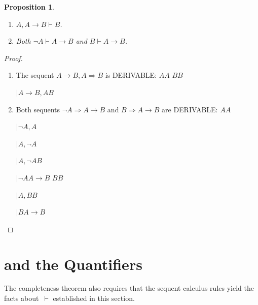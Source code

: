 \documentclass[10pt,a4paper]{article}
\newcommand*{\olup}[1]{\MakeUppercase{#1}}
\theoremstyle{plain}
\newtheorem{prop}[thm]{Proposition}
\theoremstyle{definition}
\theoremstyle{remark}
\newenvironment{explain}{}{}
\newcommand*{\olfileid}[3]{}
\newcommand*{\olsection}[1]{\section*{#1}}
\newcommand*{\ollabel}[1]{\label{#1}}
\providecommand{\RightLabel}[1]{}
\providecommand{\DisplayProof}{}
\providecommand{\fCenter}{}
\newenvironment{prooftree}{}{}
\providecommand{\lif}{\mathbin{\rightarrow}}
\providecommand{\Sequent}{\mathrel{\Rightarrow}}
\providecommand{\Proves}{\mathrel{\vdash}}
\providecommand{\LeftR}[1]{}
\providecommand{\RightR}[1]{}
\providecommand{\UnaryInf}{\ensuremath{\mid}}
\providecommand{\BinaryInf}{\ensuremath{\mid}}
\providecommand{\Weakening}{\mathrm{Wk}}
\providecommand{\RightR}{\mathrm{R}}
\providecommand{\LeftR}{\mathrm{L}}
\providecommand{\Axiom}{\mathrm{Ax}}
\providecommand{\bottomAlignProof}{\relax}
\begin{document}
\begin{prop}\ollabel{prop:provability-lif}
  \begin{enumerate}
  \item \ollabel{prop:provability-lif-left}  $A, A \lif B \Proves B$.
  \item \ollabel{prop:provability-lif-right}
    Both $\lnot A \Proves A \lif B$ and $B \Proves A \lif B$.
  \end{enumerate}
\end{prop}

\begin{proof}
  \begin{enumerate}
    \item The sequent $A \lif B, A \Sequent B$ is \olup{derivable}:
      \begin{prooftree}
        \Axiom$A \fCenter A$
        \Axiom$B \fCenter B$
        \RightLabel{\LeftR{\lif}}
        \BinaryInf$A \lif B, A  \fCenter B$
      \end{prooftree}
    \item Both sequents $\lnot A \Sequent A \lif B$ and $B
      \Sequent A \lif B$ are \olup{derivable}:
      \begin{prooftree}
        \Axiom$A \fCenter A$
        \RightLabel{\LeftR{\lnot}}
        \UnaryInf$\lnot A, A \fCenter$
        \RightLabel{\LeftR{\Exchange}}
        \UnaryInf$A, \lnot A \fCenter$
        \RightLabel{\RightR{\Weakening}}
        \UnaryInf$A, \lnot A \fCenter B$
        \RightLabel{\RightR{\lif}}
        \UnaryInf$\lnot A \fCenter A \lif B$
        \DisplayProof\qquad\bottomAlignProof
        \Axiom$B \fCenter B$
        \RightLabel{\LeftR{\Weakening}}
        \UnaryInf$A, B \fCenter B$
        \RightLabel{\RightR{\lif}}
        \UnaryInf$B \fCenter A \lif B$
      \end{prooftree}
  \end{enumerate}
\end{proof}





\olfileid{fol}{seq}{qpr}
\olsection{ and the Quantifiers}

\begin{explain}
  The completeness theorem also requires that the sequent calculus
  rules yield the facts about~$\Proves$ established in this
  section.
\end{explain}
\end{document}
